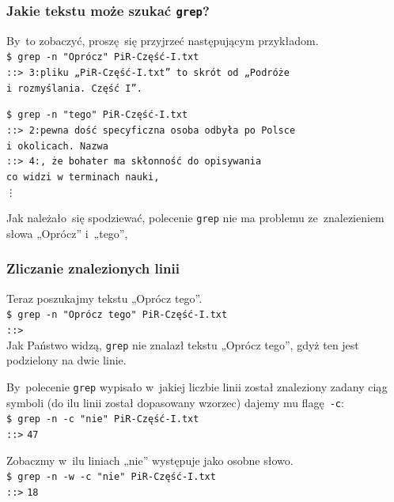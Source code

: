 \documentclass[10pt,t]{beamer}
\begin{document}
\begin{frame}
  \frametitle{Jakie tekstu może szukać \texttt{grep}?}


  By~to zobaczyć, proszę~się przyjrzeć następującym przykładom. \\
  \texttt{\$ grep -n "Oprócz"{} PiR-Część-I.txt} \\
  \texttt{::> 3:pliku „PiR-Część-I.txt” to skrót od „Podróże} \\
  \texttt{i~rozmyślania. Część I”. }

  \texttt{\$ grep -n "tego"{} PiR-Część-I.txt} \\
  \texttt{::> 2:pewna dość specyficzna osoba odbyła po~Polsce} \\
  \texttt{i~okolicach. Nazwa } \\
  \texttt{::> 4:, że~bohater ma skłonność do opisywania
    } \\
  \texttt{co widzi w~terminach nauki,} \\
  \hspace{2em} \texttt{\vdots}

  Jak należało~się spodziewać, polecenie \texttt{grep} nie ma problemu
  ze~znalezieniem słowa „Oprócz” i~„tego”,

\end{frame}





\begin{frame}
  \frametitle{Zliczanie znalezionych linii}


  Teraz poszukajmy tekstu „Oprócz tego”. \\
  \texttt{\$ grep -n "Oprócz tego"{} PiR-Część-I.txt} \\
  \texttt{::>} \\
  Jak Państwo widzą, \texttt{grep} nie znalazł tekstu „Oprócz tego”, gdyż
  ten jest podzielony na dwie linie.

  By~polecenie \texttt{grep} wypisało w~jakiej liczbie linii został
  znaleziony zadany ciąg symboli (do ilu linii został dopasowany wzorzec)
  dajemy mu flagę~\texttt{-c}: \\
  \texttt{\$ grep -n -c "nie"{} PiR-Część-I.txt} \\
  \texttt{::>} \texttt{47}

  Zobaczmy w~ilu liniach „nie” występuje jako osobne słowo. \\
  \texttt{\$ grep -n -w -c "nie"{} PiR-Część-I.txt} \\
  \texttt{::>} \texttt{18}

\end{frame}
\end{document}
